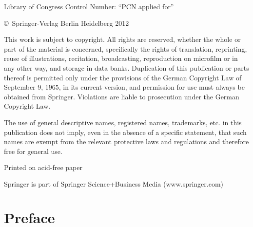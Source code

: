 {\noindent {}\fontsize{8}{9}\selectfont

\noindent Library of Congress Control Number: ``PCN applied for''\vspace*{9pt}


\noindent \copyright\ Springer-Verlag Berlin Heidelberg 2012

\noindent This work is subject to copyright. All rights are reserved,
whether the whole or part of the material is concerned,
specifically the rights of translation, reprinting, reuse of
illustrations, recitation, broadcasting, reproduction on microfilm
or in any other way, and storage in data banks. Duplication of
this publication or parts thereof is permitted only under the
provisions of the German Copyright Law of September 9, 1965, in
its current version, and permission for use must always be
obtained from Springer. Violations are liable to prosecution under
the German Copyright Law. %

\noindent The use of general descriptive names, registered names,
trademarks, etc. in this publication does not imply, even in the
absence of a specific statement, that such names are exempt from
the relevant protective laws and regulations and therefore free
for general use.\vspace*{9pt}



\noindent Printed on acid-free paper\vspace*{9pt}

\noindent Springer is part of Springer Science+Business Media (www.springer.com)\par}

\egroup


\chapter*{Preface}

